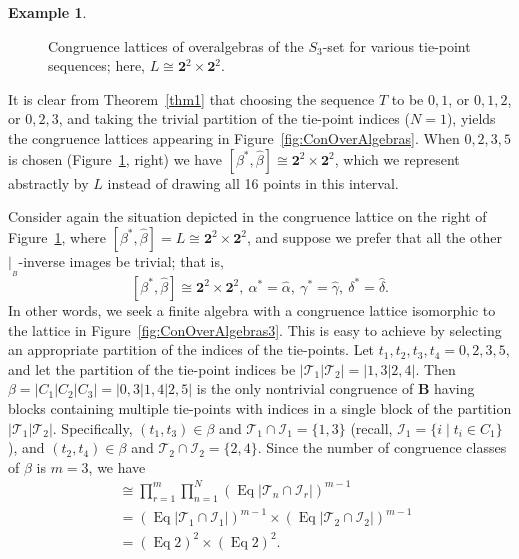 \documentclass{au}
\numberwithin{equation}{section}
\theoremstyle{plain}
\theoremstyle{definition}
\newtheorem{example}[theorem]{Example}
\newcommand{\<}{\ensuremath{\langle}}
\renewcommand{\>}{\ensuremath{\rangle}}
\newcommand{\bB}{\ensuremath{\mathbf{B}}}
\newcommand{\sT}{\ensuremath{\mathscr{T}}}
\newcommand{\sI}{\ensuremath{\mathcal{I}}}
\DeclareMathOperator{\Eq}{Eq}
\newcommand{\resB}{\ensuremath{|_{_B}}}
\newcommand{\two}{\ensuremath{\mathbf{2}}}
\newcommand{\hbeta}{\ensuremath{\widehat{\beta}}}
\begin{document}
\begin{example}
\begin{figure}[h!]
  \caption{Congruence lattices of overalgebras of the $S_3$-set for various
    tie-point sequences; here, $L\cong \two^2\times\two^2$.}
  \label{fig:ConOverAlgebras2}
\end{figure}

   It is clear from Theorem~\ref{thm1}
 that choosing the sequence $T$ to be $0,1$, or $0,1,2$, or $0, 2, 3$, and taking
 the trivial partition of the tie-point indices ($N=1$),
  yields the congruence lattices appearing in Figure~\ref{fig:ConOverAlgebras}.
When $0, 2, 3, 5$ is chosen
(Figure~\ref{fig:ConOverAlgebras2}, right) we have
$[\beta^*,\widehat{\beta}] \cong \two^2\times\two^2$, which we represent abstractly by $L$
instead of drawing all 16 points in this interval.

\end{example}

Consider again the situation depicted in the congruence lattice on the right of
Figure~\ref{fig:ConOverAlgebras2}, where
$[\beta^*,\widehat{\beta}] = L \cong \two^2\times\two^2$, and suppose we prefer
that all the other $\resB$-inverse images be trivial; that is,
\[
[\beta^*,\widehat{\beta}]\cong \two^2\times\two^2, \ %
\alpha^*=\widehat{\alpha}, \ %
\gamma^*=\widehat{\gamma}, \ %
\delta^*=\widehat{\delta}.
\]
In other words, we seek a finite algebra with a congruence lattice isomorphic to
the lattice in Figure~\ref{fig:ConOverAlgebras3}.
This is easy to achieve by selecting an appropriate partition of the indices
of the tie-points.  Let $t_1, t_2, t_3, t_4 = 0, 2, 3, 5$, and let
the partition of the tie-point indices be $|\sT_1|\sT_2| = |1, 3|2, 4|$.
Then $\beta = |C_1|C_2|C_3| = |0,3|1,4|2,5|$ is the only nontrivial congruence of
$\bB$ having blocks containing multiple tie-points with indices in a single
block of the partition $|\sT_1|\sT_2|$.  Specifically,
$(t_1, t_3) \in \beta$ and $\sT_1\cap \sI_1 = \{1,3\}$ (recall, $\sI_1 = \{i \mid
t_i \in C_1\}$), and  $(t_2, t_4) \in \beta$ and $\sT_2\cap \sI_2 = \{2,4\}$.
Since the number of congruence classes of $\beta$ is $m = 3$, we have
\begin{align*}
[\beta^*, \hbeta] &\cong
\prod_{r=1}^m \prod_{n=1}^N (\Eq |\sT_n \cap \sI_r|)^{m-1}\\
&=
(\Eq|\sT_1\cap \sI_1|)^{m-1} \times
(\Eq|\sT_2\cap \sI_2|)^{m-1} \\
&=
(\Eq %
2)^2 \times (\Eq%
2)^2.
\end{align*}
\end{document}
